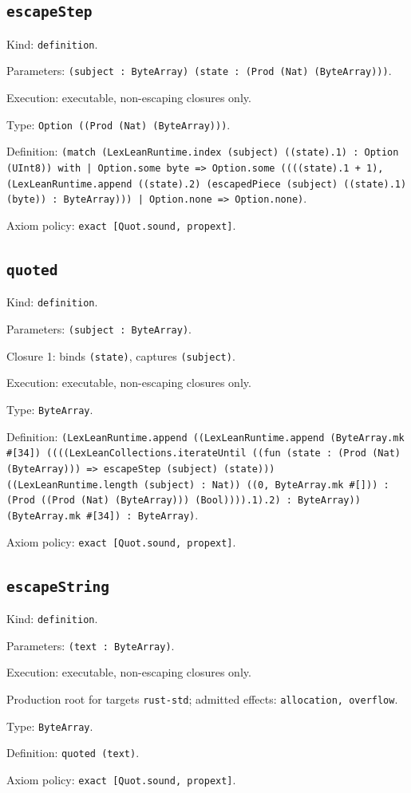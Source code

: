 \documentclass[11pt]{article}
\begin{document}
\subsection*{\texttt{escapeStep}}
\noindent Kind: \texttt{definition}.\par
\noindent Parameters: \texttt{(subject : ByteArray) (state : (Prod (Nat) (ByteArray)))}.\par
\noindent Execution: executable, non-escaping closures only.\par
\noindent Type: \texttt{Option ((Prod (Nat) (ByteArray)))}.\par
\noindent Definition: \texttt{(match (LexLeanRuntime.index (subject) ((state).1) : Option (UInt8)) with | Option.some byte => Option.some ((((state).1 + 1), (LexLeanRuntime.append ((state).2) (escapedPiece (subject) ((state).1) (byte)) : ByteArray))) | Option.none => Option.none)}.\par
\noindent Axiom policy: \texttt{exact [Quot.sound, propext]}.\par
\subsection*{\texttt{quoted}}
\noindent Kind: \texttt{definition}.\par
\noindent Parameters: \texttt{(subject : ByteArray)}.\par
\noindent Closure 1: binds \texttt{(state)}, captures \texttt{(subject)}.\par
\noindent Execution: executable, non-escaping closures only.\par
\noindent Type: \texttt{ByteArray}.\par
\noindent Definition: \texttt{(LexLeanRuntime.append ((LexLeanRuntime.append (ByteArray.mk \#[34]) ((((LexLeanCollections.iterateUntil ((fun (state : (Prod (Nat) (ByteArray))) => escapeStep (subject) (state))) ((LexLeanRuntime.length (subject) : Nat)) ((0, ByteArray.mk \#[])) : (Prod ((Prod (Nat) (ByteArray))) (Bool)))).1).2) : ByteArray)) (ByteArray.mk \#[34]) : ByteArray)}.\par
\noindent Axiom policy: \texttt{exact [Quot.sound, propext]}.\par
\subsection*{\texttt{escapeString}}
\noindent Kind: \texttt{definition}.\par
\noindent Parameters: \texttt{(text : ByteArray)}.\par
\noindent Execution: executable, non-escaping closures only.\par
\noindent Production root for targets \texttt{rust-std}; admitted effects: \texttt{allocation, overflow}.\par
\noindent Type: \texttt{ByteArray}.\par
\noindent Definition: \texttt{quoted (text)}.\par
\noindent Axiom policy: \texttt{exact [Quot.sound, propext]}.\par
\end{document}
